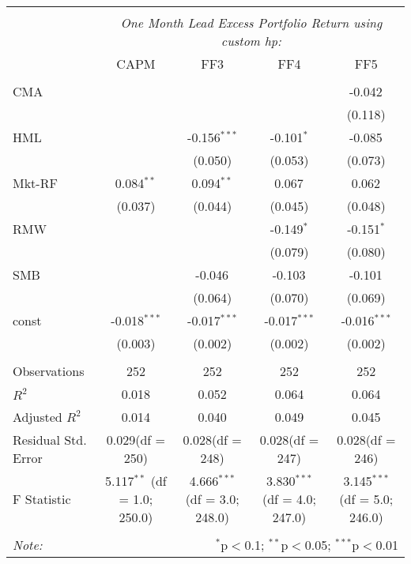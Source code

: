 \begin{table}[!htbp] \centering
\begin{tabular}{@{\extracolsep{5pt}}lcccc}
\\[-1.8ex]\hline
\hline \\[-1.8ex]
& \multicolumn{4}{c}{\textit{One Month Lead Excess Portfolio Return using custom hp:}} \
\cr \cline{4-5}
\\[-1.8ex] & CAPM & FF3 & FF4 & FF5 \\
\hline \\[-1.8ex]
 CMA & & & & -0.042$^{}$ \\
  & & & & (0.118) \\
 HML & & -0.156$^{***}$ & -0.101$^{*}$ & -0.085$^{}$ \\
  & & (0.050) & (0.053) & (0.073) \\
 Mkt-RF & 0.084$^{**}$ & 0.094$^{**}$ & 0.067$^{}$ & 0.062$^{}$ \\
  & (0.037) & (0.044) & (0.045) & (0.048) \\
 RMW & & & -0.149$^{*}$ & -0.151$^{*}$ \\
  & & & (0.079) & (0.080) \\
 SMB & & -0.046$^{}$ & -0.103$^{}$ & -0.101$^{}$ \\
  & & (0.064) & (0.070) & (0.069) \\
 const & -0.018$^{***}$ & -0.017$^{***}$ & -0.017$^{***}$ & -0.016$^{***}$ \\
  & (0.003) & (0.002) & (0.002) & (0.002) \\
\hline \\[-1.8ex]
 Observations & 252 & 252 & 252 & 252 \\
 $R^2$ & 0.018 & 0.052 & 0.064 & 0.064 \\
 Adjusted $R^2$ & 0.014 & 0.040 & 0.049 & 0.045 \\
 Residual Std. Error & 0.029(df = 250) & 0.028(df = 248) & 0.028(df = 247) & 0.028(df = 246)  \\
 F Statistic & 5.117$^{**}$ (df = 1.0; 250.0) & 4.666$^{***}$ (df = 3.0; 248.0) & 3.830$^{***}$ (df = 4.0; 247.0) & 3.145$^{***}$ (df = 5.0; 246.0) \\
\hline
\hline \\[-1.8ex]
\textit{Note:} & \multicolumn{4}{r}{$^{*}$p$<$0.1; $^{**}$p$<$0.05; $^{***}$p$<$0.01} \\
\end{tabular}
\end{table}
